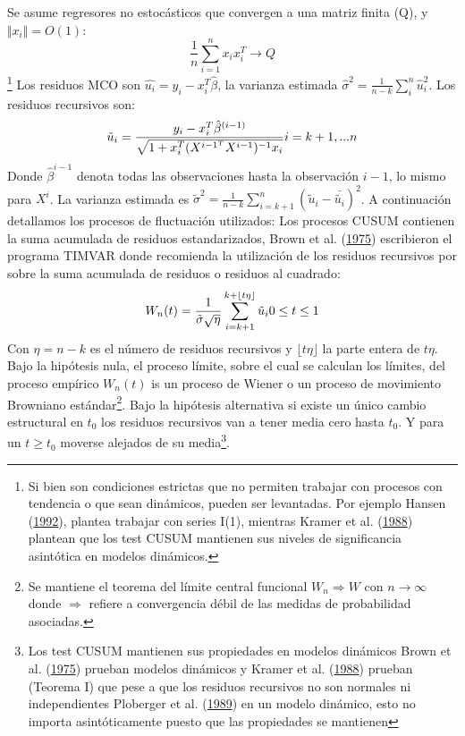 \documentclass[12pt,oneside]{reedthesis}
\begin{document}
Se asume regresores no estocásticos que convergen a una matriz finita (Q), y \(\Vert x_i\Vert = O(1)\):
\begin{equation}
\frac{1}{n}\sum_{i=1}^nx_ix_i^T \to Q
\end{equation}\footnote{Si bien son condiciones estrictas que no permiten trabajar con procesos con tendencia o que sean dinámicos, pueden ser levantadas. Por ejemplo Hansen (\protect\hyperlink{ref-Hansen1992}{1992}), plantea trabajar con series I(1), mientras Kramer et al. (\protect\hyperlink{ref-Society1988}{1988}) plantean que los test CUSUM mantienen sus niveles de significancia asintótica en modelos dinámicos.}
Los residuos MCO son \(\hat{u_i} = y_i - x_i^T\hat{\beta}\), la varianza estimada \(\hat{\sigma}^2 = \frac{1}{n-k}\sum_i^n\hat{u}_i^2\).
Los residuos recursivos son:
\begin{equation}
\tilde{u}_i = \frac{y_i-x_i^T\hat{\beta}^{(i-1)}}{\sqrt{1+x_i^T(X^{i-1^T}X^{i-1})^{-1}x_i}} \space\space\space\space\space\space i = k+1, ... n
\end{equation}
Donde \(\hat{\beta}^{i-1}\) denota todas las observaciones hasta la observación \(i-1\), lo mismo para \(X^i\). La varianza estimada es \(\tilde{\sigma}^2 = \frac{1}{n-k}\sum_{i=k+1}^n(\tilde{u}_i-\bar{\tilde{u_i}})^2\).
A continuación detallamos los procesos de fluctuación utilizados:
Los procesos CUSUM contienen la suma acumulada de residuos estandarizados, Brown et al. (\protect\hyperlink{ref-Brown1975}{1975}) escribieron el programa TIMVAR donde recomienda la utilización de los residuos recursivos por sobre la suma acumulada de residuos o residuos al cuadrado:
\begin{equation}
W_n(t) = \frac{1}{\tilde\sigma\sqrt \eta}\sum_{i=k+1}^{k+\lfloor t\eta\rfloor}\tilde u_i \space\space\space\space\space 0 \leq t \leq1
\end{equation}
Con \(\eta = n-k\) es el número de residuos recursivos y \(\lfloor t\eta\rfloor\) la parte entera de \(t\eta\). Bajo la hipótesis nula, el proceso límite, sobre el cual se calculan los límites, del proceso empírico \(W_n(t)\) is un proceso de Wiener o un proceso de movimiento Browniano estándar\footnote{Se mantiene el teorema del límite central funcional $W_n \Rightarrow W$ con $n \to \infty$ donde $\Rightarrow$ refiere a convergencia débil de las medidas de probabilidad asociadas.}. Bajo la hipótesis alternativa si existe un único cambio estructural en \(t_0\) los residuos recursivos van a tener media cero hasta \(t_0\). Y para un \(t \geq t_0\) moverse alejados de su media\footnote{Los test CUSUM mantienen sus propiedades en modelos dinámicos Brown et al. (\protect\hyperlink{ref-Brown1975}{1975}) prueban modelos dinámicos y Kramer et al. (\protect\hyperlink{ref-Society1988}{1988}) prueban (Teorema I) que pese a que los residuos recursivos no son normales ni independientes Ploberger et al. (\protect\hyperlink{ref-Ploberger1989}{1989}) en un modelo dinámico, esto no importa asintóticamente puesto que las propiedades se mantienen}.
\end{document}
